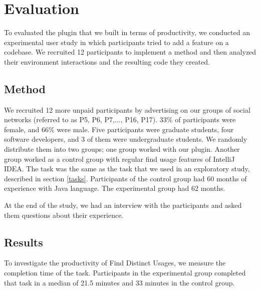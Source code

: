 \documentclass[conference]{IEEEtran}
\begin{document}
\section{Evaluation}
To evaluated the plugin that we built in terms of productivity, we conducted an experimental user study in which participants tried to add a feature on a codebase. We recruited 12 participants to implement a method and then analyzed their environment interactions and the resulting code they created. 

\subsection{Method}

We recruited 12 more unpaid participants by advertising on our groups of social networks (referred to as P5, P6, P7,..., P16, P17). 33\% of participants were female, and 66\% were male. Five participants were graduate students, four software developers, and 3 of them were undergraduate students. We randomly distribute them into two groups; one group worked with our plugin. Another group worked as a control group with regular find usage features of IntelliJ IDEA. The task was the same as the task that we used in an exploratory study, described in section \ref{tasks}. Participants of the control group had 60 months of experience with Java language. The experimental group had 62 months.\par 
At the end of the study, we had an interview with the participants and asked them questions about their experience.


\subsection{Results}
To investigate the productivity of Find Distinct Usages, we measure the completion time of the task. Participants in the experimental group completed that task in a median of 21.5 minutes and 33 minutes in the control group. 
\end{document}
